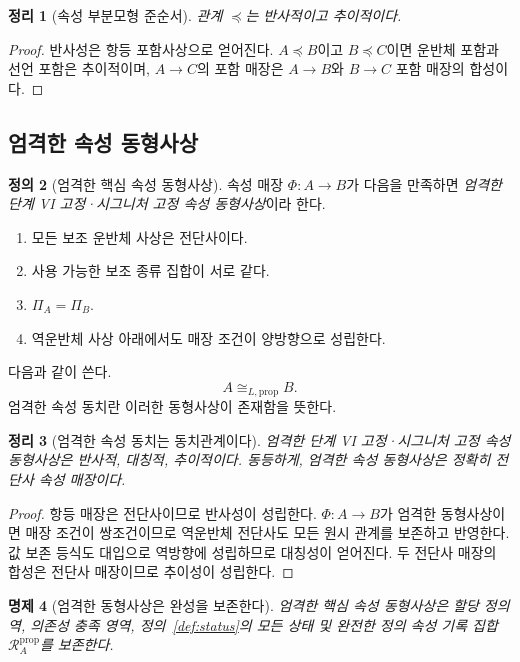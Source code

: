 \documentclass[11pt]{article}
\newcommand{\PropRec}{\mathcal R^{\mathrm{prop}}}
\newtheorem{theorem}{정리}[section]
\newtheorem{proposition}[theorem]{명제}
\theoremstyle{definition}
\newtheorem{definition}[theorem]{정의}
\theoremstyle{remark}
\begin{document}
\begin{theorem}[속성 부분모형 준순서]
관계 \(\preccurlyeq\)는 반사적이고 추이적이다.
\end{theorem}

\begin{proof}
반사성은 항등 포함사상으로 얻어진다.
\(A\preccurlyeq B\)이고 \(B\preccurlyeq C\)이면 운반체 포함과 선언 포함은 추이적이며, \(A\to C\)의 포함 매장은 \(A\to B\)와 \(B\to C\) 포함 매장의 합성이다.
\end{proof}

\subsection{엄격한 속성 동형사상}

\begin{definition}[엄격한 핵심 속성 동형사상]
\label{def:strict-iso}
속성 매장 \(\Phi:A\to B\)가 다음을 만족하면 \emph{엄격한 단계 VI 고정·시그니처 고정 속성 동형사상}이라 한다.
\begin{enumerate}[label=(S\arabic*)]
\item 모든 보조 운반체 사상은 전단사이다.
\item 사용 가능한 보조 종류 집합이 서로 같다.
\item \(\Pi_A=\Pi_B\).
\item 역운반체 사상 아래에서도 매장 조건이 양방향으로 성립한다.
\end{enumerate}
다음과 같이 쓴다.
\[
A\cong_{L,\mathrm{prop}} B.
\]
엄격한 속성 동치란 이러한 동형사상이 존재함을 뜻한다.
\end{definition}

\begin{theorem}[엄격한 속성 동치는 동치관계이다]
\label{thm:strict-equivalence}
엄격한 단계 VI 고정·시그니처 고정 속성 동형사상은 반사적, 대칭적, 추이적이다.
동등하게, 엄격한 속성 동형사상은 정확히 전단사 속성 매장이다.
\end{theorem}

\begin{proof}
항등 매장은 전단사이므로 반사성이 성립한다.
\(\Phi:A\to B\)가 엄격한 동형사상이면 매장 조건이 쌍조건이므로 역운반체 전단사도 모든 원시 관계를 보존하고 반영한다. 값 보존 등식도 대입으로 역방향에 성립하므로 대칭성이 얻어진다.
두 전단사 매장의 합성은 전단사 매장이므로 추이성이 성립한다.
\end{proof}

\begin{proposition}[엄격한 동형사상은 완성을 보존한다]
엄격한 핵심 속성 동형사상은 할당 정의역, 의존성 충족 영역, 정의~\ref{def:status}의 모든 상태 및 완전한 정의 속성 기록 집합 \(\PropRec_A\)를 보존한다.
\end{proposition}
\end{document}
